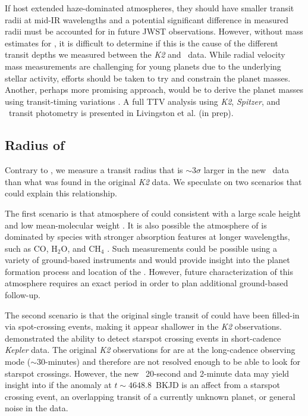 \documentclass[twocolumn]{aastex631}
\begin{document}
If \planetknown host extended haze-dominated atmospheres, they should have smaller transit radii at mid-IR wavelengths \citep{gao20} and a potential significant difference in measured radii must be accounted for in future JWST observations. However, without mass estimates for \planetknown, it is difficult to determine if this is the cause of the different transit depths we measured between the \textit{K2} and \tess\ data. While radial velocity mass measurements are challenging for young planets due to the underlying stellar activity, efforts should be taken to try and constrain the planet masses. Another, perhaps more promising approach, would be to derive the planet masses using transit-timing variations \citep[TTVs;][]{agol18}. A full TTV analysis using \textit{K2}, \textit{Spitzer}, and \tess\ transit photometry is presented in Livingston et al. (in prep). 

\subsection{Radius of \planete}

Contrary to \planetknown, we measure a transit radius that is $\sim 3\sigma$ larger in the new \tess\ data than what was found in the original \textit{K2} data. We speculate on two scenarios that could explain this relationship.

The first scenario is that atmosphere of \planete could consistent with a large scale height and low mean-molecular weight \citep{deMooij12}. It is also possible the atmosphere of \planete is dominated by species with stronger absorption features at longer wavelengths, such as CO, H$_2$O, and CH$_4$ \citep{carter09}. Such measurements could be possible using a variety of ground-based instruments \citep[e.g.][]{line21} and would provide insight into the planet formation process and location of the \planete. However, future characterization of this atmosphere requires an exact period in order to plan additional ground-based follow-up.

The second scenario is that the original single transit of \planete could have been filled-in via spot-crossing events, making it appear shallower in the \textit{K2} observations. \cite{morris17} demonstrated the ability to detect starspot crossing events in short-cadence \textit{Kepler} data. The original \textit{K2} observations for \sname are at the long-cadence observing mode ($\sim 30$-minutes) and therefore are not resolved enough to be able to look for starspot crossings. However, the new \tess\ 20-second and 2-minute data may yield insight into if the anomaly at $t \sim 4648.8$~BKJD is an affect from a starspot crossing event, an overlapping transit of a currently unknown planet, or general noise in the data.
\end{document}
